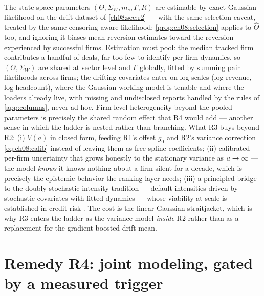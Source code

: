 The state-space parameters $(\Theta, \Sigma_W, m_s, \Gamma, R)$ are
estimable by exact Gaussian likelihood on the drift dataset of
\cref{ch08:sec:r2} --- with the same selection caveat, treated by the
same censoring-aware likelihood: \cref{prop:ch08:selection} applies to
$\hat\Theta$ too, and ignoring it biases mean-reversion estimates toward
the reversion experienced by successful firms. Estimation must pool: the
median tracked firm contributes a handful of deals, far too few to
identify per-firm dynamics, so $(\Theta, \Sigma_W)$ are shared at sector
level and $\Gamma$ globally, fitted by summing pair likelihoods across
firms; the drifting covariates enter on log scales (log revenue, log
headcount), where the Gaussian working model is tenable and where the
loaders already live, with missing and undisclosed reports handled by
the rules of \cref{app:columns}, never ad hoc. Firm-level heterogeneity
beyond the pooled parameters is precisely the shared random effect that
R4 would add --- another sense in which the ladder is nested rather than
branching. What R3 buys beyond R2:
(i) $V(a)$ in closed form, feeding R1's offset $g_0$ and R2's variance
correction \cref{eq:ch08:calib} instead of leaving them as free spline
coefficients; (ii) calibrated per-firm uncertainty that grows honestly
to the stationary variance as $a \to \infty$ --- the model
\emph{knows} it knows nothing about a firm silent for a decade, which is
precisely the epistemic behavior the ranking layer needs; (iii) a
principled bridge to the doubly-stochastic intensity tradition ---
default intensities driven by stochastic covariates with fitted dynamics
--- whose viability at scale is established in credit risk
\citep{duffie2007}. The cost is the linear-Gaussian straitjacket, which
is why R3 enters the ladder as the variance model \emph{inside} R2
rather than as a replacement for the gradient-boosted drift mean.

\section{Remedy R4: joint modeling, gated by a measured trigger}
\label{ch08:sec:r4}

